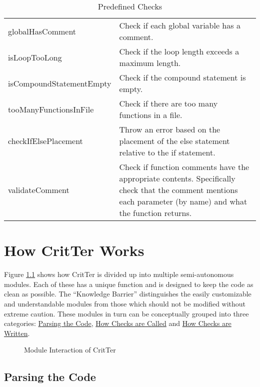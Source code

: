 \documentclass[12pt]{report}
\newcommand{\programName}{CritTer\xspace}
\begin{document}
\begin{table}
\begin{center}
\begin{tabular}{l p{10cm}}
		globalHasComment & Check if each global variable has a comment. \\
		isLoopTooLong & Check if the loop length exceeds a maximum length. \\
		isCompoundStatementEmpty  & Check if the compound statement is empty. \\
		tooManyFunctionsInFile & Check if there are too many functions in a file. \\
		checkIfElsePlacement & Throw an error based on the placement of the else statement relative to the if statement.  \\
		validateComment & Check if function comments have the appropriate contents. Specifically check that the comment mentions each parameter (by name) and what the function returns. \\
		\bottomrule
	\end{tabular}
	\end{center}
\caption{Predefined Checks}
\label{predefinedChecks}
\end{table}

\chapter{How \programName Works}
\label{howItWorks}

Figure \ref{moduleInteraction} shows how \programName is divided up into multiple semi-autonomous 
modules. Each of these has a unique function and is designed to keep the code as clean as possible. 
The ``Knowledge Barrier'' distinguishes the easily customizable and understandable modules from 
those which should not be modified without extreme caution. These modules in turn can be 
conceptually grouped into three categories: \hyperref[parsingTheCode]{Parsing the Code}, 
\hyperref[howChecksAreCalled]{How Checks are Called} and 
\hyperref[howChecksAreWritten]{How Checks are Written}.

\begin{figure}[h!]
\begin{center}
\end{center}
\caption{Module Interaction of \programName}
\label{moduleInteraction}
\end{figure}

\section{Parsing the Code}
\label{parsingTheCode}
\end{document}
